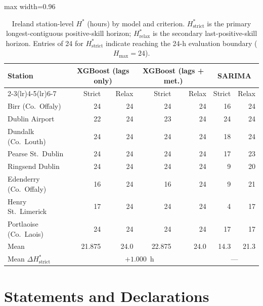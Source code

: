 \documentclass[pdflatex,sn-basic,iicol]{sn-jnl}
\begin{document}
\begin{table}[!t]
\centering
\caption{Ireland station-level $H^*$ (hours) by model and criterion.
  $H^*_{\text{strict}}$ is the primary longest-contiguous positive-skill horizon;
  $H^*_{\text{relax}}$ is the secondary last-positive-skill horizon.  Entries of 24 for
  $H^*_{\text{strict}}$ indicate reaching the 24-h evaluation boundary ($H_{\max}=24$).}
\label{tab:ireland_hstar}
\small
\begin{adjustbox}{max width=0.96\textwidth}
\begin{tabular}{lrrrrrr}
\toprule
Station &
\multicolumn{2}{c}{XGBoost (lags only)} &
\multicolumn{2}{c}{XGBoost (lags + met.)} &
\multicolumn{2}{c}{SARIMA} \\
\cmidrule(lr){2-3}\cmidrule(lr){4-5}\cmidrule(lr){6-7}
& Strict & Relax & Strict & Relax & Strict & Relax \\
\midrule
Birr (Co.\ Offaly)      & 24 & 24 & 24 & 24 & 16 & 24 \\
Dublin Airport          & 22 & 24 & 23 & 24 & 24 & 24 \\
Dundalk (Co.\ Louth)    & 24 & 24 & 24 & 24 & 18 & 24 \\
Pearse St.\ Dublin      & 24 & 24 & 24 & 24 & 17 & 23 \\
Ringsend Dublin         & 24 & 24 & 24 & 24 &  9 & 20 \\
Edenderry (Co.\ Offaly) & 16 & 24 & 16 & 24 &  9 & 21 \\
Henry St.\ Limerick     & 17 & 24 & 24 & 24 &  4 & 17 \\
Portlaoise (Co.\ Laois) & 24 & 24 & 24 & 24 & 17 & 17 \\
\midrule
Mean                    & 21.875 & 24.0 & 22.875 & 24.0 & 14.3 & 21.3 \\
Mean $\Delta H^*_{\text{strict}}$ & \multicolumn{4}{c}{$+1.000$~h} & \multicolumn{2}{c}{---} \\
\bottomrule
\end{tabular}
\end{adjustbox}
\end{table}




\FloatBarrier




\FloatBarrier

\section*{Statements and Declarations}
\end{document}
